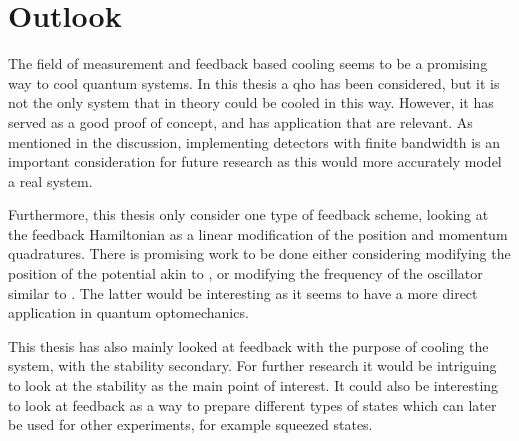 \section{Outlook}
The field of measurement and feedback based cooling seems to be a promising way to cool quantum systems. In this thesis a \gls{qho} has been considered, but it is not the only system that in theory could be cooled in this way. However, it has served as a good proof of concept, and has application that are relevant. As mentioned in the discussion, implementing detectors with finite bandwidth is an important consideration for future research as this would more accurately model a real system. 

Furthermore, this thesis only consider one type of feedback scheme, looking at the feedback Hamiltonian as a linear modification of the position and momentum quadratures. There is promising work to be done either considering modifying the position of the potential akin to \cite{De-Sousa:2025}, or modifying the frequency of the oscillator similar to \cite{Habibi:2016}. The latter would be interesting as it seems to have a more direct application in quantum optomechanics.

This thesis has also mainly looked at feedback with the purpose of cooling the system, with the stability secondary. For further research it would be intriguing to look at the stability as the main point of interest. It could also be interesting to look at feedback as a way to prepare different types of states which can later be used for other experiments, for example squeezed states.
